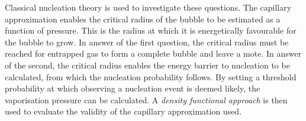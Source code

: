 Classical nucleation theory is used to investigate these questions.
The capillary approximation enables the critical radius of the bubble
to be estimated as a function of pressure.
This is the radius at which it is energetically favourable for the bubble to grow.
In answer of the first question, 
the critical radius must be reached for entrapped gas to form a complete bubble and leave a mote.
In answer of the second, the critical radius enables the energy barrier to nucleation to be calculated,
from which the nucleation probability follows.
By setting a threshold probability at which observing a nucleation event is deemed likely,
the vaporisation pressure can be calculated.
A {\em density functional approach} is then used to evaluate the validity of the capillary approximation used.
% 
%
%
%
%
%
%

% 

